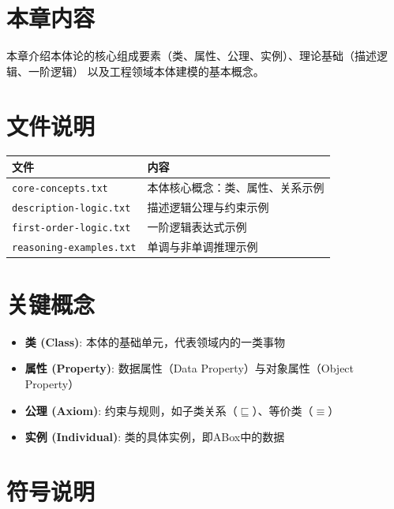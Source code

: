 
\section{本章内容}

本章介绍本体论的核心组成要素（类、属性、公理、实例）、理论基础（描述逻辑、一阶逻辑）
以及工程领域本体建模的基本概念。

\section{文件说明}

\begin{center}
\begin{tabular}{@{}ll@{}}
\toprule
\textbf{文件} & \textbf{内容} \\
\midrule
\texttt{core-concepts.txt} & 本体核心概念：类、属性、关系示例 \\
\texttt{description-logic.txt} & 描述逻辑公理与约束示例 \\
\texttt{first-order-logic.txt} & 一阶逻辑表达式示例 \\
\texttt{reasoning-examples.txt} & 单调与非单调推理示例 \\
\bottomrule
\end{tabular}
\end{center}

\section{关键概念}

\begin{itemize}
\item \textbf{类 (Class)}: 本体的基础单元，代表领域内的一类事物
\item \textbf{属性 (Property)}: 数据属性（Data Property）与对象属性（Object Property）
\item \textbf{公理 (Axiom)}: 约束与规则，如子类关系（\(\sqsubseteq\)）、等价类（\(\equiv\)）
\item \textbf{实例 (Individual)}: 类的具体实例，即ABox中的数据
\end{itemize}

\section{符号说明}

